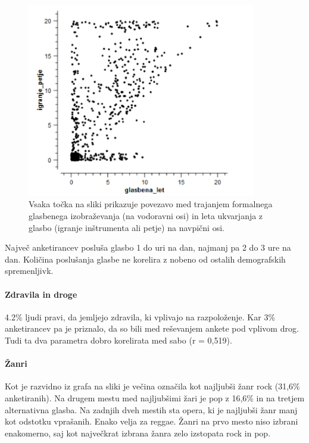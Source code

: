 \documentclass[a4paper, 12pt]{book}
\begin{document}
{\begin{figure}[hbt]
\centering
\includegraphics[width=10cm]{images/izobrazba_ukvarjanje.png}

\caption{Vsaka točka na sliki prikazuje povezavo med trajanjem formalnega glasbenega izobraževanja (na vodoravni osi) in leta ukvarjanja z glasbo (igranje inštrumenta ali petje) na navpični osi. }
\label{ukvarjanjeglizobrazba}
\end{figure}

Največ anketirancev posluša glasbo 1 do uri na dan, najmanj pa 2 do 3 ure na dan. Količina poslušanja glasbe ne korelira z nobeno od ostalih demografskih spremenljivk. 

\paragraph{Zdravila in droge}

4.2\% ljudi pravi, da jemljejo zdravila, ki vplivajo na razpoloženje. Kar 3\% anketirancev pa je priznalo, da so bili med reševanjem ankete pod vplivom drog. Tudi ta dva parametra dobro korelirata med sabo (r = 0,519).

\paragraph{Žanri}

Kot je razvidno iz grafa na sliki \cite{zanrigraf} je večina označila kot najljubši žanr rock (31,6\% anketiranih). Na drugem mestu med najljubšimi žari je pop z 16,6\% in na tretjem alternativna glasba. Na zadnjih dveh mestih sta opera, ki je najljubši žanr manj kot odstotku vprašanih. Enako velja za reggae. Žanri na prvo mesto niso izbrani enakomerno, saj kot največkrat izbrana žanra zelo izstopata rock in pop.  

}
\end{document}
